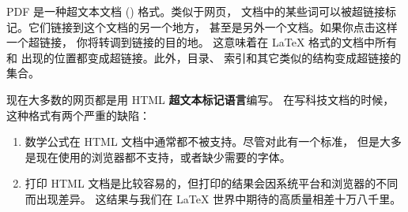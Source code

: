 
PDF 是一种超文本文档 () 格式。类似于网页，
文档中的某些词可以被超链接标记。它们链接到这个文档的另一个地方，
甚至是另外一个文档。如果你点击这样一个超链接，
你将转调到链接的目的地。
这意味着在 \LaTeX{} 格式的文档中所有  和  出现的位置都变成超链接。此外，目录、
索引和其它类似的结构变成超链接的集合。


现在大多数的网页都是用 HTML \textbf{超文本标记语言}编写。
在写科技文档的时候，这种格式有两个严重的缺陷：
\begin{enumerate}
\item 数学公式在 HTML 文档中通常都不被支持。尽管对此有一个标准，
但是大多是现在使用的浏览器都不支持，或者缺少需要的字体。
\item 打印 HTML 文档是比较容易的，但打印的结果会因系统平台和浏览器的不同
而出现差异。
这结果与我们在 \LaTeX{} 世界中期待的高质量相差十万八千里。
\end{enumerate}



